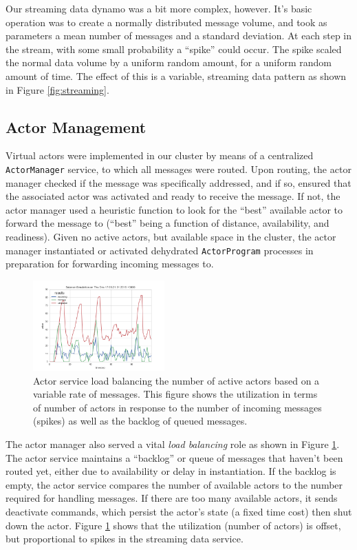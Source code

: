 \documentclass[conference,twocolumn,10pt]{IEEEtran}
\begin{document}
Our streaming data dynamo was a bit more complex, however. It's basic operation was to create a normally distributed message volume, and took as parameters a mean number of messages and a standard deviation. At each step in the stream, with some small probability a ``spike'' could occur. The spike scaled the normal data volume by a uniform random amount, for a uniform random amount of time. The effect of this is a variable, streaming data pattern as shown in Figure \ref{fig:streaming}.

\subsection{Actor Management}

Virtual actors were implemented in our cluster by means of a centralized \texttt{ActorManager} service, to which all messages were routed. Upon routing, the actor manager checked if the message was specifically addressed, and if so, ensured that the associated actor was activated and ready to receive the message. If not, the actor manager used a heuristic function to look for the ``best'' available actor to forward the message to (``best'' being a function of distance, availability, and readiness). Given no active actors, but available space in the cluster, the actor manager instantiated or activated dehydrated \texttt{ActorProgram} processes in preparation for forwarding incoming messages to.

\begin{figure}[!h]
    \centering
    \includegraphics[width=0.45\textwidth]{balance_sim_queue_lag_zero}
    \caption{Actor service load balancing the number of active actors based on a variable rate of messages. This figure shows the utilization in terms of number of actors in response to the number of incoming messages (spikes) as well as the backlog of queued messages.}
    \label{fig:load_balance}
\end{figure}

The actor manager also served a vital \textit{load balancing} role as shown in Figure \ref{fig:load_balance}. The actor service maintains a ``backlog'' or queue of messages that haven't been routed yet, either due to availability or delay in instantiation. If the backlog is empty, the actor service compares the number of available actors to the number required for handling messages. If there are too many available actors, it sends deactivate commands, which persist the actor's state (a fixed time cost) then shut down the actor. Figure \ref{fig:load_balance} shows that the utilization (number of actors) is offset, but proportional to spikes in the streaming data service.
\end{document}
